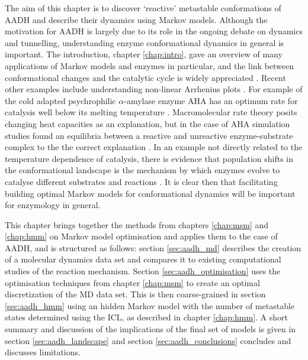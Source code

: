 The aim of this chapter is to discover `reactive' metastable conformations of AADH and describe their dynamics using Markov models. Although the motivation for AADH is largely due to its role in the ongoing debate on dynamics and tunnelling, understanding enzyme conformational dynamics in general is important. The introduction, chapter \ref{chap:intro}, gave an overview of many applications of Markov models and enzymes in particular, and the link between conformational changes and the catalytic cycle is widely appreciated \cite{karplusMolecularDynamicsProtein2005, hammesMultipleConformationalChanges2002, roca2008relationship}. Recent other examples include understanding non-linear Arrhenius plots \cite{truhlarConvexArrheniusPlots2001,danielNewUnderstandingHow2010}. For example of the cold adapted psychrophilic $\alpha$-amylase enzyme AHA has an optimum rate for catalysis well below its melting temperature \cite{aqvistHiddenConformationalStates2020}. Macromolecular rate theory \cite{arcusTemperatureDynamicsEnzymeCatalyzed2020} posits changing heat capacities as an explanation, but in the case of AHA simulation studies found an equilibria between a reactive and unreactive enzyme-substrate complex to the the correct explanation \cite{aqvistHiddenConformationalStates2020}.  In an example not directly related to the temperature dependence of catalysis, there is evidence that population shifts in the conformational landscape is the mechanism by which  enzymes evolve to catalyse different substrates and reactions \cite{maria-solanoRoleConformationalDynamics2018, campbellRoleProteinDynamics2016,romero-riveraRoleConformationalDynamics2017}. It is clear then that facilitating building optimal Markov models for conformational dynamics will be important for enzymology in general.  

This chapter brings together the methods from chapters \ref{chap:msm} and \ref{chap:hmm} on Markov model optimisation and applies them to the case of AADH, and is structured as follows: section \ref{sec:aadh_md} describes the creation of a molecular dynamics data set and compares it to existing computational studies of the reaction mechanism. Section \ref{sec:aadh_optimisation} uses the optimisation techniques from chapter \ref{chap:msm} to create an optimal discretization of the MD data set. This is then coarse-grained in section \ref{sec:aadh_hmm} using an hidden Markov model with the number of metastable states determined using the ICL, as described in chapter \ref{chap:hmm}. A short summary and discussion of the implications of the final set of models is given in section \ref{sec:aadh_landscape} and section \ref{sec:aadh_conclusions} concludes and discusses limitations. 


